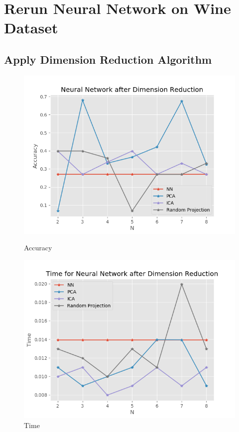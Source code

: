 \documentclass[11pt]{article}
\begin{document}
\section{Rerun Neural Network on Wine Dataset}
\subsection{Apply Dimension Reduction Algorithm}
\begin{figure}[!htb]
   \begin{minipage}{0.5\textwidth}
     \centering
     \includegraphics[width=1.2\linewidth]{../figures/wine_nn_dr.png}
     \caption{Accuracy}\label{Fig:wine_nn_dr}
   \end{minipage}\hfill
   \begin{minipage}{0.5\textwidth}
     \centering
     \includegraphics[width=1.2\linewidth]{../figures/wine_nn_dr_time.png}
     \caption{Time}\label{Fig:wine_nn_dr_time}
   \end{minipage}
\end{figure}
\end{document}
